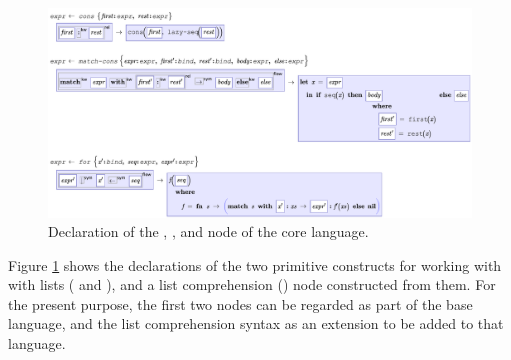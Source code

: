\begin{figure}[th]
	\centering
	
	\includegraphics[scale=0.6]{src/image/cons.pdf}
	
	\caption{Declaration of the , , and  node of the core language.}
	\label{fig-for-grammar}
\end{figure}

Figure \ref{fig-for-grammar} shows the declarations of the two primitive constructs for working with with lists ( and ), and a list comprehension () node constructed from them. For the present purpose, the first two nodes can be regarded as part of the base language, and the list comprehension syntax as an extension to be added to that language.



